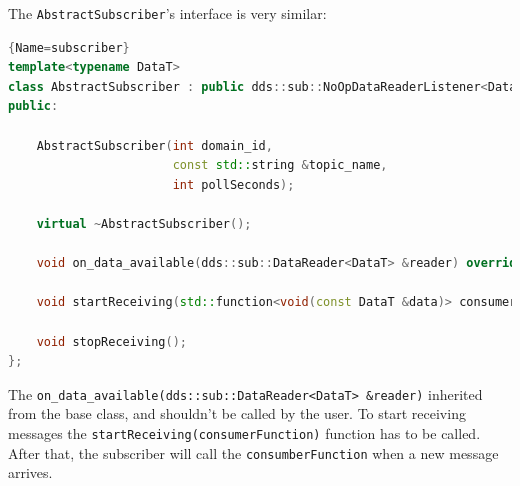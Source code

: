 \documentclass{article}
\begin{document}
The \verb+AbstractSubscriber+'s interface is very similar:
\begin{lstlisting}[language=C++]{Name=subscriber}
template<typename DataT>
class AbstractSubscriber : public dds::sub::NoOpDataReaderListener<DataT> {
public:

    AbstractSubscriber(int domain_id, 
                       const std::string &topic_name, 
                       int pollSeconds);

    virtual ~AbstractSubscriber();

    void on_data_available(dds::sub::DataReader<DataT> &reader) override ;

    void startReceiving(std::function<void(const DataT &data)> consumerFunction);

    void stopReceiving();
};
\end{lstlisting}

The \verb+on_data_available(dds::sub::DataReader<DataT> &reader)+ inherited from the base class, and shouldn't be called by the user. To start receiving messages the \verb+startReceiving(consumerFunction)+ function has to be called. After that, the subscriber will call the \verb+consumberFunction+ when a new message arrives.
\end{document}
